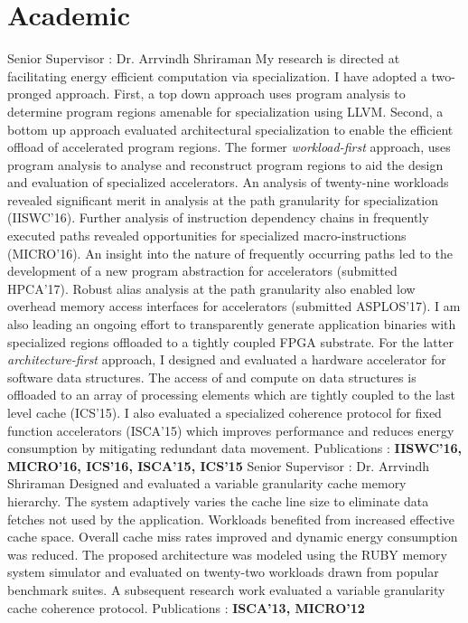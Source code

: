 
\section{Academic}
{Senior Supervisor : Dr. Arrvindh Shriraman \newline{} 
My research is directed at facilitating energy efficient computation via specialization. I have adopted a two-pronged approach. First, a top down approach uses program analysis to determine program regions amenable for specialization using LLVM. Second, a bottom up approach evaluated architectural specialization to enable the efficient offload of accelerated program regions.
\newline{}The former {\em workload-first} approach, uses program analysis to analyse and reconstruct program regions to aid the design and evaluation of specialized accelerators. An analysis of twenty-nine workloads revealed significant merit in analysis at the path granularity for specialization (IISWC'16). Further analysis of instruction dependency chains in frequently executed paths revealed opportunities for specialized macro-instructions (MICRO'16). An insight into the nature of frequently occurring paths led to the development of a new program abstraction for accelerators (submitted HPCA'17). Robust alias analysis at the path granularity also enabled low overhead memory access interfaces for accelerators (submitted ASPLOS'17). I am also leading an ongoing effort to transparently generate application binaries with specialized regions offloaded to a tightly coupled FPGA substrate.
\newline{}For the latter {\em architecture-first} approach, I designed and evaluated a hardware accelerator for software data structures. The access of and compute on data structures is offloaded to an array of processing elements which are tightly coupled to the last level cache (ICS'15). I also evaluated a specialized coherence protocol for fixed function accelerators (ISCA'15) which improves performance and reduces energy consumption by mitigating redundant data movement.
\newline{} Publications : \textbf{IISWC'16, MICRO'16, ICS'16, ISCA'15, ICS'15}}
\vspace{9pt}
{Senior Supervisor : Dr. Arrvindh Shriraman \newline{} 
Designed and evaluated a variable granularity cache memory hierarchy. The system adaptively varies the cache line size to eliminate data fetches not used by the application. Workloads benefited from increased effective cache space. Overall cache miss rates improved and dynamic energy consumption was reduced. The proposed architecture was modeled using the RUBY memory system simulator and evaluated on twenty-two workloads drawn from popular benchmark suites. A subsequent research work evaluated a variable granularity cache coherence protocol.
\newline{} Publications : \textbf{ISCA'13, MICRO'12}}
